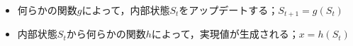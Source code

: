 \begin{itemize}
   \item 何らかの関数$g$によって，内部状態$S_t$をアップデートする；$S_{t+1}=g(S_t)$
   \item 内部状態$S_t$から何らかの関数$h$によって，実現値が生成される；$x = h(S_t)$
\end{itemize}
